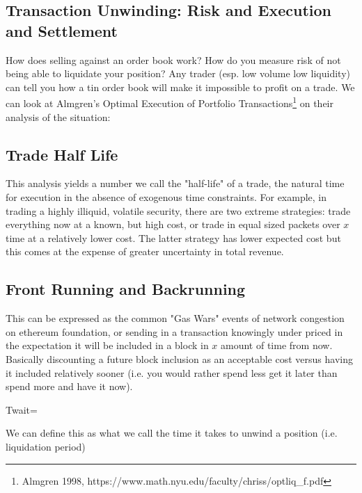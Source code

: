  \newpage


\subsection{Transaction Unwinding: Risk and Execution and Settlement}

How does selling against an order book work? How do you measure risk of not being able to liquidate your position? Any trader (esp. low volume
low liquidity) can tell you how a tin order book will make it 
impossible to profit on a trade. We can look at Almgren's Optimal 
Execution of Portfolio Transactions\footnote{Almgren 1998, https://www.math.nyu.edu/faculty/chriss/optliq_f.pdf} on their analysis of the situation:

\subsection{Trade Half Life}
This analysis yields a number we call the "half-life" of a trade, the 
natural time for execution in the absence of exogenous time 
constraints. For example, in trading a highly illiquid, volatile 
security, there are two extreme strategies: trade everything now at a 
known, but high cost, or trade in equal sized packets over $x$ time 
at a relatively lower cost. The latter strategy has lower expected cost but this comes at the expense of greater uncertainty in total revenue.



\subsection{Front Running and Backrunning}
This can be expressed as the common "Gas Wars" events of network 
congestion on ethereum foundation, or sending in a transaction knowingly under priced in the expectation it will be included in a block in $x$ amount of time from now. Basically discounting a future 
block inclusion as an acceptable cost versus having it included relatively sooner (i.e. you would rather spend less get it later than 
spend more and have it now).

T{wait}=





We can define this as what we call the time it takes to unwind a position (i.e. liquidation period)


